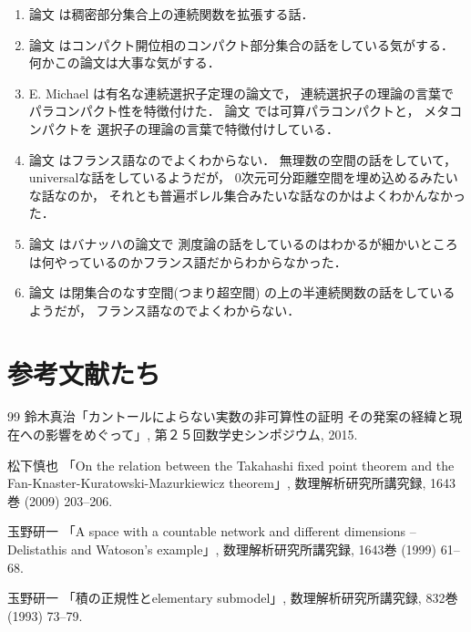 \documentclass[leqno, a4paper, 12pt]{jsarticle}
\begin{document}
\begin{enumerate}[label=(\arabic*)]
\item 
論文
\cite{MR0202115}
は稠密部分集合上の連続関数を拡張する話．

\item 
論文
\cite{MR0036503}
はコンパクト開位相のコンパクト部分集合の話をしている気がする．何かこの論文は大事な気がする．


\item 
E. Michael
は有名な連続選択子定理の論文で，
連続選択子の理論の言葉でパラコンパクト性を特徴付けた．
論文
\cite{MR0063648}
では可算パラコンパクトと，
メタコンパクトを
選択子の理論の言葉で特徴付けしている．


\item 
論文
\cite{sierpinski1931crible}
はフランス語なのでよくわからない．
無理数の空間の話をしていて，universalな話をしているようだが，
0次元可分距離空間を埋め込めるみたいな話なのか，
それとも普遍ボレル集合みたいな話なのかはよくわかんなかった．

\item 
論文
\cite{MR0025547}
はバナッハの論文で
測度論の話をしているのはわかるが細かいところは何やっているのかフランス語だからわからなかった．

\item 
論文
\cite{Kuratowski1932}
は閉集合のなす空間(つまり超空間)
の上の半連続関数の話をしているようだが，
フランス語なのでよくわからない．
\end{enumerate}




\section*{参考文献たち}

\renewcommand{\refname}{和文参考文献}

\begin{thebibliography}{99}
鈴木真治「カントールによらない実数の非可算性の証明 その発案の経緯と現在への影響をめぐって」, 
第２５回数学史シンポジウム, 
2015.


松下慎也  
「On the relation between the Takahashi fixed point theorem and the Fan-Knaster-Kuratowski-Mazurkiewicz theorem」, 
数理解析研究所講究録, 
1643巻 (2009)
203--206. 

玉野研一
「A space with a countable network and different dimensions --Delistathis and Watoson's example」, 
数理解析研究所講究録, 
1643巻 (1999)
61--68. 

玉野研一
「積の正規性とelementary submodel」, 
数理解析研究所講究録, 
832巻 (1993)
73--79. 


\end{thebibliography}



\renewcommand{\refname}{一般の参考文献}





\nocite{*}


\end{document}

